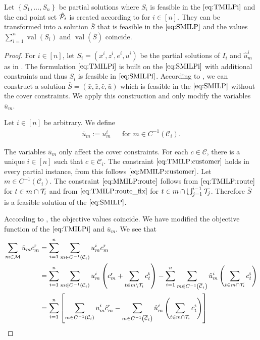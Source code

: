 \begin{theorem}
\label{thm:equivalence_TMILP_SMILP}

Let $\left\{S_1,\dots,S_n\right\}$ be partial solutions where $S_i$ is feasible in the $\eqref{eq:TMILPi}$ and the end point set $\hat{\mathcal{P}}_i$ is created according to  for ${i\in[n]}$. They can be transformed into a solution $\overline{S}$ that is feasible in the $\eqref{eq:SMILP}$ and the values ${\sum_{i=1}^n \operatorname{val}\left(S_i\right)}$ and ${\operatorname{val}(\overline{S})}$ coincide.

\end{theorem}

\begin{proof}

For ${i\in[n]}$, let ${S_i=\left(x^i,z^i,e^i,u^i\right)}$ be the partial solutions of $I_i$ and $\hat{u}^i_m$ as in . The formulation $\eqref{eq:TMILPi}$ is built on the $\eqref{eq:SMILPi}$ with additional constraints and thus $S_i$ is feasible in $\eqref{eq:SMILPi}$. According to , we can construct a solution ${\overline{S}=\left(\bar{x},\bar{z},\bar{e},\bar{u}\right)}$ which is feasible in the $\eqref{eq:SMILP}$ without the cover constraints. We apply this construction and only modify the variables $\bar{u}_m$.

Let ${i\in[n]}$ be arbitrary. We define
\begin{align*}
	\bar{u}_m := u^i_m && \text{for } m\in C^{-1}\left(\mathcal{C}_i\right).
\end{align*}

The variables $\bar{u}_m$ only affect the cover constraints. For each ${c\in\mathcal{C}}$, there is a unique ${i\in[n]}$ such that ${c\in\mathcal{C}_i}$. The constraint $\eqref{eq:TMILP:customer}$ holds in every partial instance, from this follows $\eqref{eq:MMILP:customer}$. Let ${m\in C^{-1}\left(\mathcal{C}_i\right)}$. The constraint $\eqref{eq:MMILP:route}$ follows from $\eqref{eq:TMILP:route}$ for ${t\in m\cap\mathcal{T}_i}$ and from $\eqref{eq:TMILP:route_fix}$ for ${t\in m\cap\bigcup_{j=1}^{i-1}\mathcal{T}_j}$. Therefore $\overline{S}$ is a feasible solution of the $\eqref{eq:SMILP}$.

According to , the objective values coincide. We have modified the objective function of the $\eqref{eq:TMILPi}$ and $\bar{u}_m$. We see that
\begin{align*}
	\sum_{m\in\mathcal{M}} \bar{u}_m c^{\operatorname{r}}_m & = \sum_{i=1}^n \sum_{m\in C^{-1}\left(\mathcal{C}_i\right)} u^i_m c^{\operatorname{r}}_m \\
	& = \sum_{i=1}^n \sum_{m\in C^{-1}\left(\mathcal{C}_i\right)} u^i_m\left(c^{\operatorname{r}}_m + \sum_{t\in m\backslash\mathcal{T}_i} c^{\operatorname{t}}_t\right) - \sum_{i=1}^n \sum_{m\in C^{-1}\left(\overline{\mathcal{C}}_i\right)} \hat{u}^i_m\left(\sum_{t\in m\cap\mathcal{T}_i} c^{\operatorname{t}}_t\right) \\
	& = \sum_{i=1}^n \left[\sum_{m\in C^{-1}\left(\mathcal{C}_i\right)} u^i_m \hat{c}^{\operatorname{r}}_m - \sum_{m\in C^{-1}\left(\overline{\mathcal{C}}_i\right)} \hat{u}^i_m \left(\sum_{t\in m\cap\mathcal{T}_i} c^{\operatorname{t}}_t\right)\right]
\end{align*}


\end{proof}
